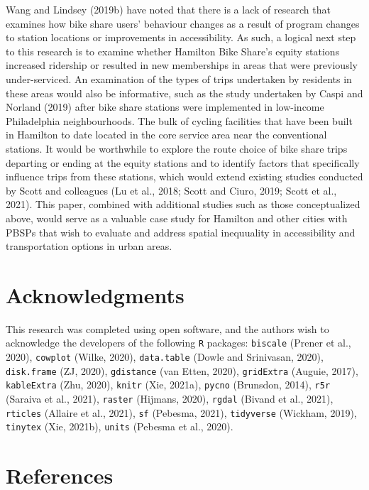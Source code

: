 \documentclass[]{elsarticle} %
\begin{document}
Wang and Lindsey (2019b) have noted that there is a lack of research
that examines how bike share users' behaviour changes as a result of
program changes to station locations or improvements in accessibility.
As such, a logical next step to this research is to examine whether
Hamilton Bike Share's equity stations increased ridership or resulted in
new memberships in areas that were previously under-serviced. An
examination of the types of trips undertaken by residents in these areas
would also be informative, such as the study undertaken by Caspi and
Norland (2019) after bike share stations were implemented in low-income
Philadelphia neighbourhoods. The bulk of cycling facilities that have
been built in Hamilton to date located in the core service area near the
conventional stations. It would be worthwhile to explore the route
choice of bike share trips departing or ending at the equity stations
and to identify factors that specifically influence trips from these
stations, which would extend existing studies conducted by Scott and
colleagues (Lu et al., 2018; Scott and Ciuro, 2019; Scott et al., 2021).
This paper, combined with additional studies such as those
conceptualized above, would serve as a valuable case study for Hamilton
and other cities with PBSPs that wish to evaluate and address spatial
inequuality in accessibility and transportation options in urban areas.

\hypertarget{acknowledgments}{%
\section{Acknowledgments}\label{acknowledgments}}

This research was completed using open software, and the authors wish to
acknowledge the developers of the following \texttt{R} packages:
\texttt{biscale} (Prener et al., 2020), \texttt{cowplot} (Wilke, 2020),
\texttt{data.table} (Dowle and Srinivasan, 2020), \texttt{disk.frame}
(ZJ, 2020), \texttt{gdistance} (van Etten, 2020), \texttt{gridExtra}
(Auguie, 2017), \texttt{kableExtra} (Zhu, 2020), \texttt{knitr} (Xie,
2021a), \texttt{pycno} (Brunsdon, 2014), \texttt{r5r} (Saraiva et al.,
2021), \texttt{raster} (Hijmans, 2020), \texttt{rgdal} (Bivand et al.,
2021), \texttt{rticles} (Allaire et al., 2021), \texttt{sf} (Pebesma,
2021), \texttt{tidyverse} (Wickham, 2019), \texttt{tinytex} (Xie,
2021b), \texttt{units} (Pebesma et al., 2020).

\hypertarget{references}{%
\section*{References}\label{references}}
\end{document}

